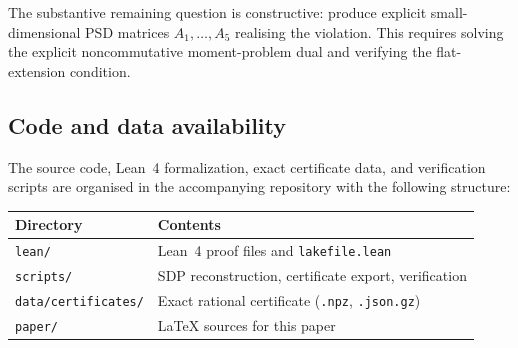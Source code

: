 The substantive remaining question is constructive: produce explicit
small-dimensional PSD matrices $A_1,\dots,A_5$ realising the
violation.  This requires solving the explicit noncommutative
moment-problem dual and verifying the flat-extension condition.

\subsection*{Code and data availability}

The source code, Lean~4 formalization, exact certificate data, and
verification scripts are organised in the accompanying repository
with the following structure:
\begin{center}
\renewcommand{\arraystretch}{1.15}
\begin{tabular}{@{}ll@{}}
\toprule
\textbf{Directory} & \textbf{Contents} \\
\midrule
\texttt{lean/}
  & Lean~4 proof files and \texttt{lakefile.lean} \\
\texttt{scripts/}
  & SDP reconstruction, certificate export, verification \\
\texttt{data/certificates/}
  & Exact rational certificate (\texttt{.npz}, \texttt{.json.gz}) \\
\texttt{paper/}
  & \LaTeX{} sources for this paper \\
\bottomrule
\end{tabular}
\end{center}





